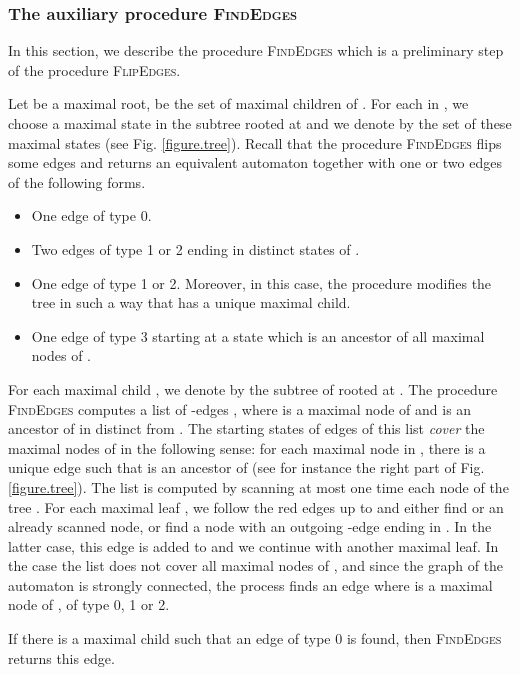 \documentclass[11pt,a4paper]{article}
\begin{document}
\pagebreak
\subsubsection{The auxiliary procedure \textsc{FindEdges}} \label{section.auxiliary}

In this section, we describe the procedure \textsc{FindEdges}
which is a preliminary step of the procedure \textsc{FlipEdges}.

Let  be a maximal root,  be the set of maximal children of
. For each  in , we choose a maximal state  in the
subtree rooted at  and we denote by  the set of these maximal
states (see Fig. \ref{figure.tree}). Recall that the procedure
\textsc{FindEdges} flips some edges and returns an equivalent
automaton together with one or two edges of the following forms.
\begin{itemize}
\item One edge  of type 0.
\item Two edges  of type 1 or 2 ending in distinct states of
  .
\item One edge  of type 1 or 2.  Moreover, in this case, the
  procedure modifies the tree  in such a way that  has a unique
  maximal child.
\item One edge  of type 3 starting at a
  state which is an ancestor of all maximal nodes of .
\end{itemize} 

For each maximal child , we denote by  the subtree of 
rooted at . The procedure \textsc{FindEdges} computes a
list  of -edges , where  is a maximal node of
 and  is an ancestor of  in  distinct from . The
starting states  of edges of this list \emph{cover} the maximal
nodes of  in the following sense: for each maximal node  in
, there is a unique edge  such that  is an
ancestor of  (see for instance the right part of Fig.
\ref{figure.tree}). The list  is computed by scanning at most one
time each node of the tree . For each maximal leaf , we
follow the red edges up to  and either find  or an already
scanned node, or find a node with an outgoing -edge ending in
. In the latter case, this edge is added to  and we continue
with another maximal leaf. In the case the list  does not cover
all maximal nodes of , and since the graph of the automaton
is strongly connected, the process finds an edge  where
 is a maximal node of , of type 0, 1 or 2.

If there is a maximal child  such that an edge  of
type 0 is found, then \textsc{FindEdges} returns this
edge. 
\end{document}
